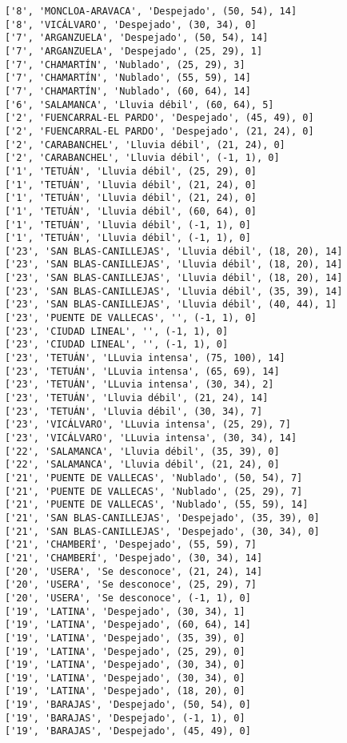 \documentclass[11pt]{article}
\begin{document}
\begin{Verbatim}[commandchars=\\\{\}]
['8', 'MONCLOA-ARAVACA', 'Despejado', (50, 54), 14]
['8', 'VICÁLVARO', 'Despejado', (30, 34), 0]
['7', 'ARGANZUELA', 'Despejado', (50, 54), 14]
['7', 'ARGANZUELA', 'Despejado', (25, 29), 1]
['7', 'CHAMARTÍN', 'Nublado', (25, 29), 3]
['7', 'CHAMARTÍN', 'Nublado', (55, 59), 14]
['7', 'CHAMARTÍN', 'Nublado', (60, 64), 14]
['6', 'SALAMANCA', 'Lluvia débil', (60, 64), 5]
['2', 'FUENCARRAL-EL PARDO', 'Despejado', (45, 49), 0]
['2', 'FUENCARRAL-EL PARDO', 'Despejado', (21, 24), 0]
['2', 'CARABANCHEL', 'Lluvia débil', (21, 24), 0]
['2', 'CARABANCHEL', 'Lluvia débil', (-1, 1), 0]
['1', 'TETUÁN', 'Lluvia débil', (25, 29), 0]
['1', 'TETUÁN', 'Lluvia débil', (21, 24), 0]
['1', 'TETUÁN', 'Lluvia débil', (21, 24), 0]
['1', 'TETUÁN', 'Lluvia débil', (60, 64), 0]
['1', 'TETUÁN', 'Lluvia débil', (-1, 1), 0]
['1', 'TETUÁN', 'Lluvia débil', (-1, 1), 0]
['23', 'SAN BLAS-CANILLEJAS', 'Lluvia débil', (18, 20), 14]
['23', 'SAN BLAS-CANILLEJAS', 'Lluvia débil', (18, 20), 14]
['23', 'SAN BLAS-CANILLEJAS', 'Lluvia débil', (18, 20), 14]
['23', 'SAN BLAS-CANILLEJAS', 'Lluvia débil', (35, 39), 14]
['23', 'SAN BLAS-CANILLEJAS', 'Lluvia débil', (40, 44), 1]
['23', 'PUENTE DE VALLECAS', '', (-1, 1), 0]
['23', 'CIUDAD LINEAL', '', (-1, 1), 0]
['23', 'CIUDAD LINEAL', '', (-1, 1), 0]
['23', 'TETUÁN', 'LLuvia intensa', (75, 100), 14]
['23', 'TETUÁN', 'LLuvia intensa', (65, 69), 14]
['23', 'TETUÁN', 'LLuvia intensa', (30, 34), 2]
['23', 'TETUÁN', 'Lluvia débil', (21, 24), 14]
['23', 'TETUÁN', 'Lluvia débil', (30, 34), 7]
['23', 'VICÁLVARO', 'LLuvia intensa', (25, 29), 7]
['23', 'VICÁLVARO', 'LLuvia intensa', (30, 34), 14]
['22', 'SALAMANCA', 'Lluvia débil', (35, 39), 0]
['22', 'SALAMANCA', 'Lluvia débil', (21, 24), 0]
['21', 'PUENTE DE VALLECAS', 'Nublado', (50, 54), 7]
['21', 'PUENTE DE VALLECAS', 'Nublado', (25, 29), 7]
['21', 'PUENTE DE VALLECAS', 'Nublado', (55, 59), 14]
['21', 'SAN BLAS-CANILLEJAS', 'Despejado', (35, 39), 0]
['21', 'SAN BLAS-CANILLEJAS', 'Despejado', (30, 34), 0]
['21', 'CHAMBERÍ', 'Despejado', (55, 59), 7]
['21', 'CHAMBERÍ', 'Despejado', (30, 34), 14]
['20', 'USERA', 'Se desconoce', (21, 24), 14]
['20', 'USERA', 'Se desconoce', (25, 29), 7]
['20', 'USERA', 'Se desconoce', (-1, 1), 0]
['19', 'LATINA', 'Despejado', (30, 34), 1]
['19', 'LATINA', 'Despejado', (60, 64), 14]
['19', 'LATINA', 'Despejado', (35, 39), 0]
['19', 'LATINA', 'Despejado', (25, 29), 0]
['19', 'LATINA', 'Despejado', (30, 34), 0]
['19', 'LATINA', 'Despejado', (30, 34), 0]
['19', 'LATINA', 'Despejado', (18, 20), 0]
['19', 'BARAJAS', 'Despejado', (50, 54), 0]
['19', 'BARAJAS', 'Despejado', (-1, 1), 0]
['19', 'BARAJAS', 'Despejado', (45, 49), 0]

\end{Verbatim}
\end{document}

